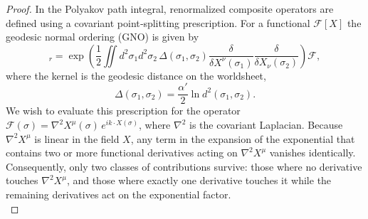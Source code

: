 \begin{tcolorbox}[breakable]
	\begin{proof}
			In the Polyakov path integral, renormalized composite operators are defined using a covariant point‑splitting prescription. For a functional $\mathcal{F}[X]$ the geodesic normal ordering (GNO) is given by
			\begin{equation}
				[\mathcal{F}]_r = \exp\!\left( \frac12 \iint d^2\sigma_1 d^2\sigma_2 \,\Delta(\sigma_1,\sigma_2) \frac{\delta}{\delta X^\nu(\sigma_1)} \frac{\delta}{\delta X_\nu(\sigma_2)} \right) \mathcal{F},
			\end{equation}
			where the kernel is the geodesic distance on the worldsheet,
			\begin{equation}
				\Delta(\sigma_1,\sigma_2) = \frac{\alpha'}{2}\ln d^2(\sigma_1,\sigma_2).
			\end{equation}
			We wish to evaluate this prescription for the operator $\mathcal{F}(\sigma)=\nabla^2 X^\mu(\sigma)\,e^{ik\cdot X(\sigma)}$, where $\nabla^2$ is the covariant Laplacian. Because $\nabla^2 X^\mu$ is linear in the field $X$, any term in the expansion of the exponential that contains two or more functional derivatives acting on $\nabla^2 X^\mu$ vanishes identically. Consequently, only two classes of contributions survive: those where no derivative touches $\nabla^2 X^\mu$, and those where exactly one derivative touches it while the remaining derivatives act on the exponential factor.\\
			

\end{proof}
\end{tcolorbox}
